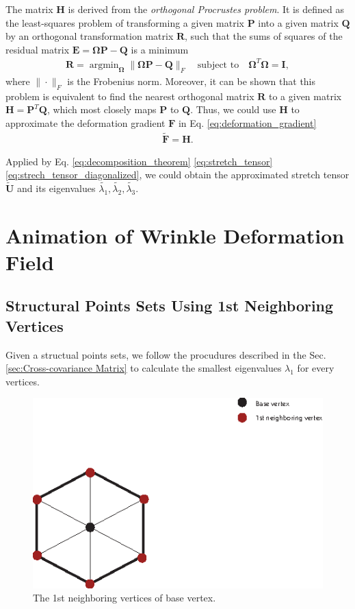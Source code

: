 \documentclass{llncs}
\begin{document}
The matrix $\mathbf{H}$ is derived from the \emph{orthogonal Procrustes problem}\cite{schonemann1966generalized}. It is defined as the least-squares problem of transforming a given matrix $\mathbf{P}$ into a given matrix $\mathbf{Q}$ by an orthogonal transformation matrix $\mathbf{R}$, such that the sums of squares of the residual matrix $\mathbf{E}=\mathbf{\Omega} \mathbf{P} - \mathbf{Q}$ is a minimum
\begin{align}
\mathbf{R}=\mathop{\arg\min}_{\mathbf{\Omega}} \| \mathbf{\Omega} \mathbf{P} - \mathbf{Q} \|_{F} \quad \mbox{subject to} \quad \mathbf{\Omega}^T\mathbf{\Omega}=\mathbf{I},
\end{align}
where $\| \cdot \|_{F}$ is the Frobenius norm. Moreover, it can be shown\cite{zhang2000flexible} that this problem is equivalent to find the nearest orthogonal matrix $\mathbf{R}$ to a given matrix $\mathbf{H} = \mathbf{P}^T \mathbf{Q}$, which most closely maps $\mathbf{P}$ to $\mathbf{Q}$. Thus, we could use $\mathbf{H}$ to approximate the deformation gradient $\mathbf{F}$ in Eq. \eqref{eq:deformation_gradient}
\begin{align}
\widetilde{\mathbf{F}} = \mathbf{H}.
\end{align}

Applied by Eq. \eqref{eq:decomposition_theorem} \eqref{eq:stretch_tensor} \eqref{eq:strech_tensor_diagonalized}, we could obtain the approximated stretch tensor $\widetilde{\mathbf{U}}$ and its eigenvalues $\tilde{\lambda_1},\tilde{\lambda_2},\tilde{\lambda_3}$.

\section{Animation of Wrinkle Deformation Field}
\subsection{Structural Points Sets Using 1st Neighboring Vertices}
Given a structual points sets, we follow the procudures described in the Sec. \ref{sec:Cross-covariance Matrix} to calculate the smallest eigenvalues $\lambda_1$ for every vertices.
\begin{figure}
 \centering
 \includegraphics{image//neighboring_point.eps}
 \caption{The 1st neighboring vertices of base vertex.}
 \label{fig:first_neighboring_vertices}
\end{figure}
\end{document}
